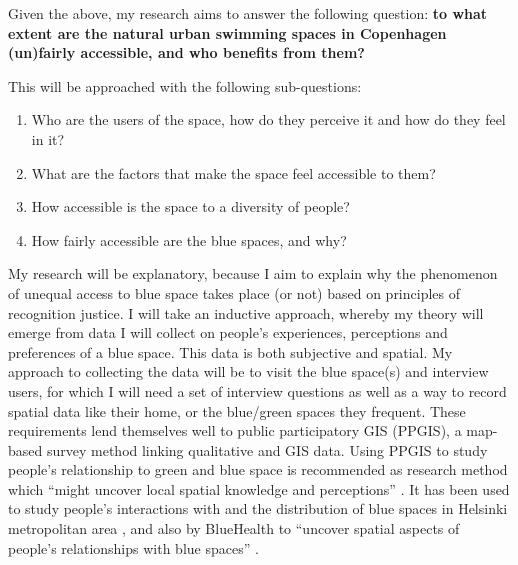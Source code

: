 \documentclass{article}
\begin{document}
Given the above, my research aims to answer the following question: \textbf{to what extent are the natural urban swimming spaces in Copenhagen (un)fairly accessible, and who benefits from them?} %

This will be approached with the following sub-questions:

\begin{enumerate}
	\item Who are the users of the space, how do they perceive it and how do they feel in it?
	\item What are the factors that make the space feel accessible to them?
	\item How accessible is the space to a diversity of people? %
	\item How fairly accessible are the blue spaces, and why?
\end{enumerate}

My research will be explanatory, because I aim to explain why the phenomenon of unequal access to blue space takes place (or not) based on principles of recognition justice.
I will take an inductive approach, whereby my theory will emerge from data I will collect on people's experiences, perceptions and preferences of a blue space. This data is both subjective and spatial. My approach to collecting the data will be to visit the blue space(s) and interview users, for which I will need a set of interview questions as well as a way to record spatial data like their home, or the blue/green spaces they frequent.
These requirements lend themselves well to public participatory GIS (PPGIS), a map-based survey method linking qualitative and GIS data.
Using PPGIS to study people's relationship to green and blue space is recommended as research method which ``might uncover local spatial knowledge and perceptions'' \parencite{anguelovski2020expanding}. It has been used to study people's interactions with and the distribution of blue spaces in Helsinki metropolitan area \parencite{raymond2016integrating}, and also by BlueHealth to ``uncover spatial aspects of people’s relationships with blue spaces'' \parencite{bluehealthsoftgis}.

\printbibliography
\end{document}
